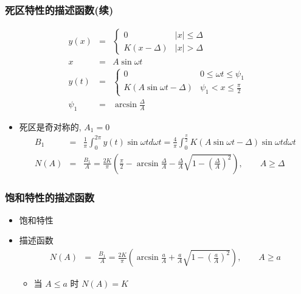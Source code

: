 \documentclass[table]{article}
\begin{document}
\begin{frame}
\frametitle{死区特性的描述函数(续)}
\label{sec-2-2-2}

\begin{eqnarray*}
y(x) & = &\begin{cases} 
0  &  |x| \leq \Delta \\
K(x-\Delta)  & |x|>\Delta   \end{cases} \\
x &=& A\sin\omega t \\
y(t) &=& \begin{cases} 
0  &  0\leq \omega t \leq \psi_1 \\
K(A\sin\omega t-\Delta)  & \psi_1 < x \leq \frac{\pi}{2}   \end{cases} \\
\psi_1 &=& \arcsin\frac{\Delta}{A}
\end{eqnarray*}
\begin{itemize}
\item <2-> 死区是奇对称的,  $A_1 = 0$
      \begin{eqnarray*}
      B_1 &=& \frac{1}{\pi}\int_0^{2\pi}y(t)\sin\omega t d\omega t 
           =  \frac{4}{\pi}\int_0^{\frac{\pi}{2}}K(A\sin\omega t -\Delta)\sin\omega t d\omega t \\
      N(A)&=&  \frac{B_1}{A} =\frac{2K}{\pi}\left(\frac{\pi}{2}-\arcsin\frac{\Delta}{A}-\frac{\Delta}{A}\sqrt{1-(\frac{\Delta}{A})^2}\right),\qquad A\geq\Delta
      \end{eqnarray*}
\end{itemize}
\end{frame}
\begin{frame}
\frametitle{饱和特性的描述函数}
\label{sec-2-2-3}
\begin{itemize}

\item 饱和特性
\label{sec-2-2-3-1}%

\item 描述函数\\
\label{sec-2-2-3-2}%
\begin{eqnarray*}
N(A) &=& \frac{B_1}{A} 
      =   \frac{2K}{\pi}\left(\arcsin\frac{a}{A}+\frac{a}{A}\sqrt{1-(\frac{a}{A})^2}\right) ,\qquad A\geq a 
\end{eqnarray*}
\begin{itemize}
\item <3->当  $A\leq a$  时  $N(A)=K$
\end{itemize}
\end{itemize} %
\end{frame}
\end{document}
